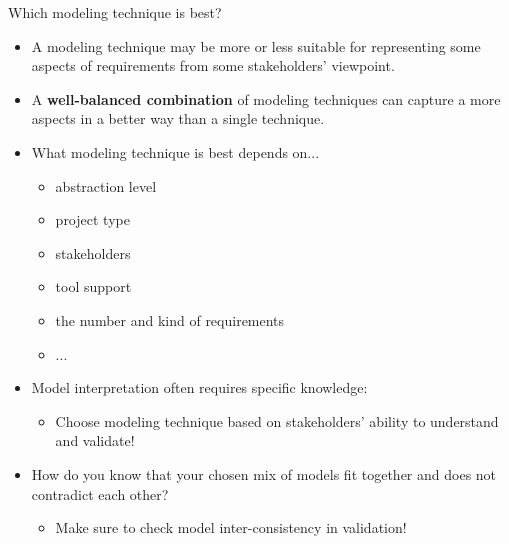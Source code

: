 
\begin{Slide}{Which modeling technique is best? }

\begin{itemize}
\item A modeling technique may be more or less suitable for representing some aspects of requirements from some stakeholders' viewpoint.

\item A \textbf{well-balanced combination} of modeling techniques can capture a more aspects in a better way than a single technique.

\item What modeling technique is best depends on...
\begin{itemize}
\item abstraction level
\item project type
\item stakeholders
\item tool support
\item the number and kind of requirements
\item ...

\end{itemize}
\item Model interpretation often requires specific knowledge: 
\begin{itemize}
\item Choose modeling technique based on stakeholders' ability to understand and validate!

\end{itemize}
\item How do you know that your chosen mix of models fit together and does not contradict each other?
\begin{itemize}
\item Make sure to check model inter-consistency in validation!

\end{itemize}
\end{itemize}
\end{Slide}
